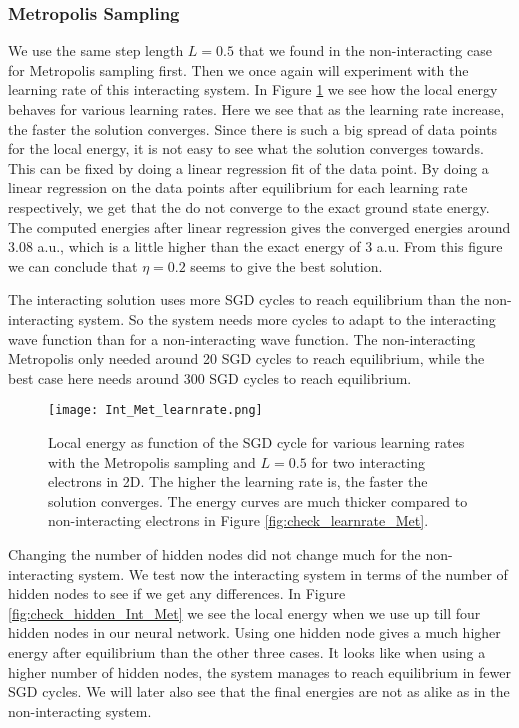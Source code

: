 \documentclass[12pt,a4paper,english]{article}
\begin{document}
\subsubsection{Metropolis Sampling}
\label{subsubsect:Results_int_Metropolis}
We use the same step length $L=0.5$ that we found in the non-interacting case for Metropolis sampling first. Then we once again will experiment with the learning rate of this interacting system. In Figure \ref{fig:check_learnrate_Int_Met} we see how the local energy behaves for various learning rates. Here we see that as the learning rate increase, the faster the solution converges. Since there is such a big spread of data points for the local energy, it is not easy to see what the solution converges towards. This can be fixed by doing a linear regression fit of the data point. By doing a linear regression on the data points after equilibrium for each learning rate respectively, we get that the do not converge to the exact ground state energy. The computed energies after linear regression gives the converged energies around 3.08 a.u., which is a little higher than the exact energy of 3 a.u. From this figure we can conclude that $\eta=0.2$ seems to give the best solution.

The interacting solution uses more SGD cycles to reach equilibrium than the non-interacting system. So the system needs more cycles to adapt to the interacting wave function than for a non-interacting wave function. The non-interacting Metropolis only needed around 20 SGD cycles to reach equilibrium, while the best case here needs around 300 SGD cycles to reach equilibrium.

\begin{figure}[htbp!]
	\centering\texttt{[image: Int\_Met\_learnrate.png]}
	\caption{Local energy as function of the SGD cycle for various learning rates with the Metropolis sampling and $L=0.5$ for two interacting electrons in 2D. The higher the learning rate is, the faster the solution converges. The energy curves are much thicker compared to non-interacting electrons in Figure \ref{fig:check_learnrate_Met}. \label{fig:check_learnrate_Int_Met}}
\end{figure} 

Changing the number of hidden nodes did not change much for the non-interacting system. We test now the interacting system in terms of the number of hidden nodes to see if we get any differences. In Figure 
\ref{fig:check_hidden_Int_Met} we see the local energy when we use up till four hidden nodes in our neural network. Using one hidden node gives a much higher energy after equilibrium than the other three cases. It looks like when using a higher number of hidden nodes, the system manages to reach equilibrium in fewer SGD cycles. We will later also see that the final energies are not as alike as in the non-interacting system.
\end{document}
